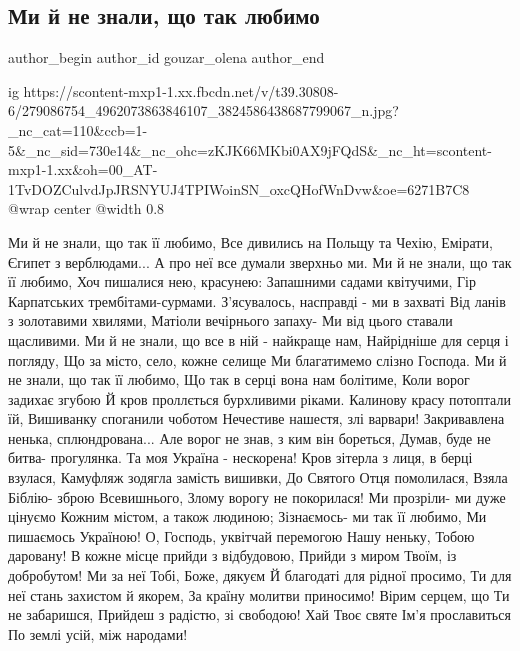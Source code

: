  
 
 
 
 
\subsection{Ми й не знали, що так любимо}
\label{sec:26_04_2022.fb.gouzar_olena.1.ne_znaly_scho_tak_ii_ljubymo}
 
\ifcmt
 author_begin
   author_id gouzar_olena
 author_end
\fi


\ifcmt
  ig https://scontent-mxp1-1.xx.fbcdn.net/v/t39.30808-6/279086754_4962073863846107_3824586438687799067_n.jpg?_nc_cat=110&ccb=1-5&_nc_sid=730e14&_nc_ohc=zKJK66MKbi0AX9jFQdS&_nc_ht=scontent-mxp1-1.xx&oh=00_AT-1TvDOZCulvdJpJRSNYUJ4TPIWoinSN_oxcQHofWnDvw&oe=6271B7C8
  @wrap center
  @width 0.8
\fi

\raggedcolumns
\begin{multicols}{3} %
\setlength{\parindent}{0pt}

\obeycr
Ми й не знали, що так її любимо,
Все дивились на Польщу та Чехію,
Емірати, Єгипет з верблюдами...
А про неї все думали зверхньо ми.
\smallskip
Ми й не знали, що так її любимо,
Хоч пишалися нею, красунею:
Запашними садами квітучими,
Гір Карпатських трембітами-сурмами.
\smallskip
З'ясувалось, насправді - ми в захваті
Від ланів з золотавими хвилями,
Матіоли вечірнього запаху-
Ми від цього ставали щасливими.
\smallskip
Ми й не знали, що все в ній - найкраще нам,
Найрідніше для серця і погляду,
Що за місто, село, кожне селище
Ми благатимемо слізно Господа.
\smallskip
Ми й не знали, що так її любимо,
Що так в серці вона нам болітиме,
Коли ворог задихає згубою
Й кров проллється бурхливими ріками.
\smallskip
Калинову красу потоптали їй,
Вишиванку споганили чоботом
Нечестиве нашестя, злі варвари!
Закривавлена ненька, сплюндрована...
\smallskip
Але ворог не знав, з ким він бореться,
Думав, буде не битва- прогулянка.
Та моя Україна - нескорена!
\smallskip
Кров зітерла з лиця, в берці взулася,
Камуфляж зодягла замість вишивки,
До Святого Отця помолилася,
Взяла Біблію- зброю Всевишнього,
Злому ворогу не покорилася!
\smallskip
Ми прозріли- ми дуже цінуємо
Кожним містом, а також людиною;
Зізнаємось- ми так її любимо,
Ми пишаємось Україною!
\smallskip
О, Господь, уквітчай перемогою
Нашу неньку, Тобою даровану!
В кожне місце прийди з відбудовою,
Прийди з миром Твоїм, із добробутом!
\smallskip
Ми за неї Тобі, Боже, дякуєм
Й благодаті для рідної просимо,
Ти для неї стань захистом й якорем,
За країну молитви приносимо!
\smallskip
Вірим серцем, що Ти не забаришся,
Прийдеш з радістю, зі свободою!
Хай Твоє святе Ім'я прославиться
По землі усій, між народами!
\restorecr

\end{multicols} %
